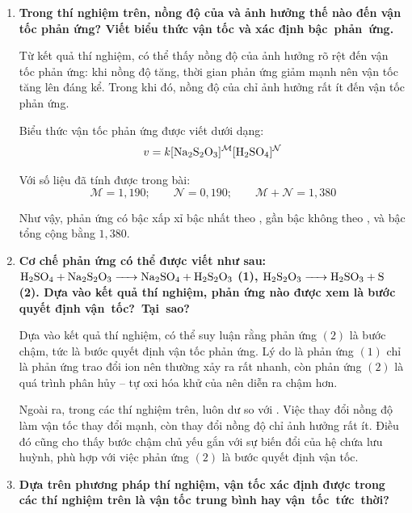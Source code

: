 \begin{enumerate}
    \item \textbf{Trong thí nghiệm trên, nồng độ của  và  ảnh hưởng thế nào đến vận tốc phản ứng? Viết biểu thức vận tốc và xác định \mbox{bậc phản ứng.}}

        Từ kết quả thí nghiệm, có thể thấy nồng độ của  ảnh hưởng rõ rệt đến vận tốc phản ứng: khi nồng độ  tăng, thời gian phản ứng giảm mạnh nên vận tốc tăng lên đáng kể. Trong khi đó, nồng độ của  chỉ ảnh hưởng rất ít đến vận tốc phản ứng.

        Biểu thức vận tốc phản ứng được viết dưới dạng:
        \begin{equation}
            v = k[\ce{Na2S2O3}]^{\mathcal{M}}[\ce{H2SO4}]^{\mathcal{N}}
        \end{equation}

        Với số liệu đã tính được trong bài:
        \begin{equation}
            \mathcal{M} = 1,190; \qquad \mathcal{N} = 0,190; \qquad \mathcal{M} + \mathcal{N} = 1,380
        \end{equation}

        Như vậy, phản ứng có bậc xấp xỉ bậc nhất theo , gần bậc không theo , và bậc tổng cộng bằng \(1,380\).

    \item \textbf{Cơ chế phản ứng có thể được viết như sau: \(\ce{H2SO4 + Na2S2O3 -> Na2SO4 + H2S2O3}\) (1), \(\ce{H2S2O3 -> H2SO3 + S}\) (2). Dựa vào kết quả thí nghiệm, phản ứng nào được xem là bước quyết định \mbox{vận tốc? Tại sao?}}

        Dựa vào kết quả thí nghiệm, có thể suy luận rằng phản ứng \((2)\) là bước chậm, tức là bước quyết định vận tốc phản ứng. Lý do là phản ứng \((1)\) chỉ là phản ứng trao đổi ion nên thường xảy ra rất nhanh, còn phản ứng \((2)\) là quá trình phân hủy -- tự oxi hóa khử của  nên diễn ra chậm hơn.

        Ngoài ra, trong các thí nghiệm trên,  luôn dư so với . Việc thay đổi nồng độ  làm vận tốc thay đổi mạnh, còn thay đổi nồng độ  chỉ ảnh hưởng rất ít. Điều đó cũng cho thấy bước chậm chủ yếu gắn với sự biến đổi của hệ chứa lưu huỳnh, phù hợp với việc phản ứng \((2)\) là bước quyết định vận tốc.

    \item \textbf{Dựa trên phương pháp thí nghiệm, vận tốc xác định được trong các thí nghiệm trên là vận tốc trung bình hay \mbox{vận tốc tức thời?}}


\end{enumerate}
